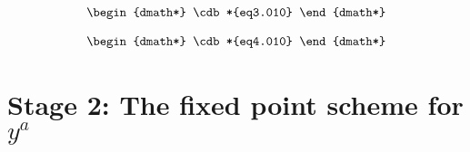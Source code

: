 \documentclass[12pt]{cdblatex}
\begin{document}
\clearpage
\begin{dgroup*}
   \begin{dmath*} \cdb*{eq3.010} \end{dmath*}
\end{dgroup*}

\clearpage
\begin{dgroup*}
   \begin{dmath*} \cdb*{eq4.010} \end{dmath*}
\end{dgroup*}

\clearpage

\section*{Stage 2: The fixed point scheme for $y^a$}
\end{document}
